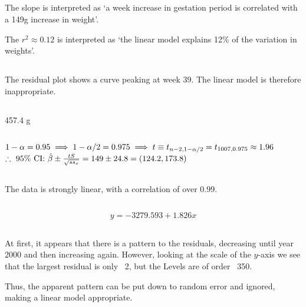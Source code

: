 \documentclass[twocolumn]{article}
\begin{document}
\subsection{}
The slope is interpreted as `a week increase in gestation period is correlated with a 149g increase in weight'.

The $r^2\approx0.12$ is interpreted as `the linear model explains 12\% of the variation in weights'.
\subsection{}
The residual plot shows a curve peaking at week 39. The linear model is therefore inappropriate.



\subsection{} 457.4 g
\subsection{} $1-\alpha=0.95\implies 1-\alpha/2=0.975\\\implies t\equiv t_{n-2,1-\alpha/2}=t_{1007,0.975}\approx 1.96$\\
$\therefore\text{ 95\% CI: }\hat \beta \pm \frac{tS}{\sqrt{ss_x}}=149\pm 24.8\\=(124.2,173.8)$

\subsection{}
The data is strongly linear, with a correlation of over 0.99.
\subsection{}
\[y=-3279.593+1.826x\]
\newpage
\subsection{}
At first, it appears that there is a pattern to the residuals, decreasing until year 2000 and then increasing again. However, looking at the scale of the $y$-axis we see that the largest residual is only ~2, but the  Levels are of order ~350.

Thus, the apparent pattern can be put down to random error and ignored, making a linear model appropriate.
\end{document}
